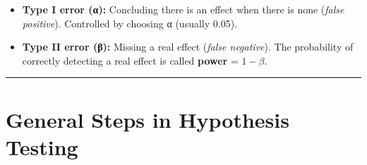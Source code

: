\documentclass[
  12pt,
  letterpaper,
]{book}
\newcounter{none} %
\providecommand{\tightlist}{%
  \setlength{\itemsep}{0pt}\setlength{\parskip}{0pt}}
\begin{document}
\begin{table}

\caption{\label{tbl-errors}Type I and Type II Errors in Hypothesis
Testing}


\end{table}%

\begin{itemize}
\tightlist
\item
  \textbf{Type I error (α):} Concluding there is an effect when there is
  none (\emph{false positive}). Controlled by choosing α (usually 0.05).
\item
  \textbf{Type II error (β):} Missing a real effect (\emph{false
  negative}). The probability of correctly detecting a real effect is
  called \textbf{power} = \(1 - \beta\).
\end{itemize}

\begin{center}\rule{0.5\linewidth}{0.5pt}\end{center}

\section{General Steps in Hypothesis
Testing}\label{general-steps-in-hypothesis-testing}
\end{document}
